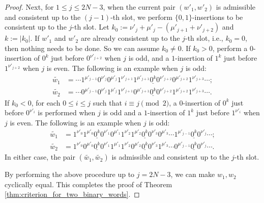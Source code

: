\documentclass[10pt,a4paper]{amsart}
\begin{document}
\begin{proof}
    Next, for $1 \leq j \leq 2N - 3$, when the current pair $(w'_1, w'_2)$ is admissible and consistent up to the $(j-1)$-th slot, we perform $\{0,1\}$-insertions to be consistent up to the $j$-th slot.
    Let $k_0 := \nu'_j + \mu'_j - (\mu'_{j+1} + \nu'_{j+2})$ and $k := |k_0|$.
    If $w'_1$ and $w'_2$ are already consistent up to the $j$-th slot, i.e., $k_0 = 0$, then nothing needs to be done. So we can assume $k_0 \neq 0$.
    If $k_0 > 0$, perform a $0$-insertion of $0^k$ just before $0^{\nu'_{j+2}}$ when $j$ is odd, and a $1$-insertion of $1^k$ just before $1^{\nu'_{j+2}}$ when $j$ is even. 
    The following is an example when $j$ is odd:
    \[
        \begin{split}
            \widetilde{w_1} &= \cdots 1^{\mu'_{j-1}} 0^{\nu'_j} 0^{\mu'_j} 1^{\nu'_{j+1}} 1^{\mu'_{j+1}} \underline{0^{k}} 0^{\nu'_{j+2}} 0^{\mu'_{j+2}} 1^{\nu'_{j+3}} \cdots; \\
            \widetilde{w_2} &= \cdots 0^{\mu'_{j-1}} 0^{\nu'_j} 1^{\mu'_j} 1^{\nu'_{j+1}} 0^{\mu'_{j+1}} \underline{0^{k}} 0^{\nu'_{j+2}} 1^{\mu'_{j+2}} 1^{\nu'_{j+3}} \cdots.
        \end{split}
    \]
    If $k_0 < 0$, for each $0 \leq i \leq j$ such that $i \equiv j \pmod{2}$, 
    a $0$-insertion of $0^k$ just before $0^{\nu'_i}$ is performed when $j$ is odd and a $1$-insertion of $1^k$ just before $1^{\nu'_i}$ when $j$ is even. 
    The following is an example when $j$ is odd:
    \[
        \begin{split}
            \widetilde{w_1} &= 1^{\nu'_0} 1^{\mu'_0} \underline{0^{k}} 0^{\nu'_1} 0^{\mu'_1} 1^{\nu'_2} 1^{\mu'_2} \underline{0^{k}} 0^{\nu'_3} 0^{\mu'_3}\cdots 1^{\mu'_{j-1}} \underline{0^{k}} 0^{\nu'_j} \cdots; \\
            \widetilde{w_2} &= 1^{\nu'_0} 0^{\mu'_0} \underline{0^{k}} 0^{\nu'_1} 1^{\mu'_1} 1^{\nu'_2} 0^{\mu'_2} \underline{0^{k}} 0^{\nu'_3} 1^{\mu'_3}\cdots 0^{\mu'_{j-1}} \underline{0^{k}} 0^{\nu'_j} \cdots.
        \end{split}
    \]
    In either case, the pair $(\widetilde{w_1}, \widetilde{w_2})$ is admissible and consistent up to the $j$-th slot. 
    
    By performing the above procedure up to $j = 2N-3$, we can make $w_1, w_2$ cyclically equal. 
    This completes the proof of Theorem \ref{thm:criterion_for_two_binary_words}.
\end{proof}
\end{document}
